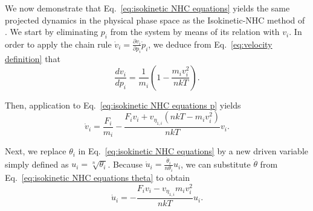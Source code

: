 \documentclass[
aip,
jcp,
reprint,
]{revtex4-1}
\newcommand{\diff}[2]{\frac{\partial #2}{\partial #1}} %
\newcommand{\nn}{n}
\begin{document}
We now demonstrate that Eq.~\eqref{eq:isokinetic NHC equations} yields the same projected dynamics in the physical phase space as the Isokinetic-NHC method of \citeauthor{Minary_2004} \cite{Minary_2004}.
We start by eliminating $p_i$ from the system by means of its relation with $v_i$.
In order to apply the chain rule $\dot{v}_i = \diff{p_i}{v_i} \dot{p}_i$, we deduce from Eq.~\eqref{eq:velocity definition} that
\begin{equation}
\label{eq:velocity derivative wrt momentum}
\frac{d v_i}{d p_i} = \frac{1}{m_i} \left(1 - \frac{m_i v_i^2}{\nn k T}\right).
\end{equation}

Then, application to Eq.~\eqref{eq:isokinetic NHC equations p} yields
\begin{equation}
\label{eq:v-based NHC equation}
\dot{v}_i = \frac{F_i}{m_i} - \frac{F_i v_i + v_{\eta_{1,i}} (\nn k T - m_i v_i^2)}{\nn k T} v_i.
\end{equation}

Next, we replace $\theta_i$ in Eq.~\eqref{eq:isokinetic NHC equations} by a new driven variable simply defined as $u_i = \sqrt[\nn]{\theta_i}$.
Because $\dot{u}_i = \frac{\dot{\theta}_i}{\nn \theta_i} u_i$,
we can substitute $\dot{\theta}$ from Eq.~\eqref{eq:isokinetic NHC equations theta} to obtain
\begin{equation}
\label{eq:u equation of motion}
\dot{u}_i = -\frac{F_i v_i - v_{\eta_{1,i}} m_i v_i^2}{\nn kT} u_i.
\end{equation}
\end{document}
